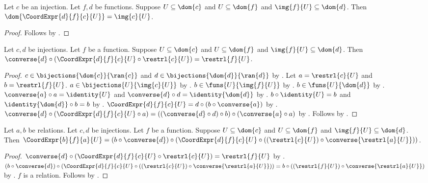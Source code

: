 \begin{theorem}\label{coordinate_expression_domain}
    Let $c$ be an injection.
    Let $f,d$ be functions.
    Suppose $U\subseteq\dom{c}$ and $U\subseteq\dom{f}$ and
        $\img{f}{U}\subseteq\dom{d}$.
    Then $\dom{\CoordExpr{d}{f}{c}{U}}=\img{c}{U}$.
\end{theorem}
\begin{proof}
    Follows by .
\end{proof}

\begin{theorem}\label{coordinate_expression_reconstruction}
    Let $c,d$ be injections.
    Let $f$ be a function.
    Suppose $U\subseteq\dom{c}$ and $U\subseteq\dom{f}$ and
        $\img{f}{U}\subseteq\dom{d}$.
    Then $\converse{d}\circ(\CoordExpr{d}{f}{c}{U}\circ\restrl{c}{U})=\restrl{f}{U}$.
\end{theorem}
\begin{proof}
    $c\in\bijections{\dom{c}}{\ran{c}}$ and
        $d\in\bijections{\dom{d}}{\ran{d}}$ by
        .
    Let $a=\restrl{c}{U}$ and $b=\restrl{f}{U}$.
    $a\in\bijections{U}{\img{c}{U}}$ by .
    $b\in\funs{U}{\img{f}{U}}$ by .
    $b\in\funs{U}{\dom{d}}$ by .
    $\converse{a}\circ a=\identity{U}$ and
        $\converse{d}\circ d=\identity{\dom{d}}$ by .
    $b\circ\identity{U}=b$ and $\identity{\dom{d}}\circ b=b$ by
        .
    $\CoordExpr{d}{f}{c}{U}=d\circ(b\circ\converse{a})$ by
        .
    $\converse{d}\circ(\CoordExpr{d}{f}{c}{U}\circ a)
        =((\converse{d}\circ d)\circ b)\circ(\converse{a}\circ a)$ by .
    Follows by \auto.
\end{proof}

\begin{theorem}\label{coordinate_expression_change_charts}
    Let $a,b$ be relations.
    Let $c,d$ be injections.
    Let $f$ be a function.
    Suppose $U\subseteq\dom{c}$ and $U\subseteq\dom{f}$ and
        $\img{f}{U}\subseteq\dom{d}$.
    Then $\CoordExpr{b}{f}{a}{U}=(b\circ\converse{d})\circ
        (\CoordExpr{d}{f}{c}{U}\circ((\restrl{c}{U})\circ\converse{\restrl{a}{U}}))$.
\end{theorem}
\begin{proof}
    $\converse{d}\circ(\CoordExpr{d}{f}{c}{U}\circ\restrl{c}{U})=\restrl{f}{U}$ by
        .
    $(b\circ\converse{d})\circ
        (\CoordExpr{d}{f}{c}{U}\circ((\restrl{c}{U})\circ\converse{\restrl{a}{U}}))
        =b\circ((\restrl{f}{U})\circ\converse{\restrl{a}{U}})$ by .
    $f$ is a relation.
    Follows by .
\end{proof}

